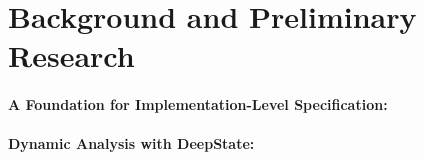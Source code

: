 \section{Background and Preliminary Research}

\paragraph{A Foundation for Implementation-Level Specification:}


\paragraph{Dynamic Analysis with DeepState:}


